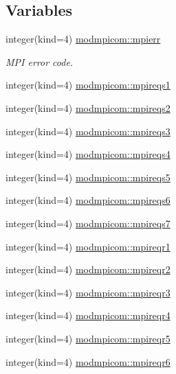 \subsection*{Variables}
\begin{DoxyCompactItemize}
\item 
integer(kind=4) \hyperlink{namespacemodmpicom_a500c48035640d6e5b49b1b694372bcd3}{modmpicom\+::mpierr}
\begin{DoxyCompactList}\small\item\em M\+PI error code. \end{DoxyCompactList}\item 
integer(kind=4) \hyperlink{namespacemodmpicom_a34052e13410e6236c45dcfc1b5563200}{modmpicom\+::mpireqs1}
\item 
integer(kind=4) \hyperlink{namespacemodmpicom_a24670bd8507b230a6be2c2f3afabf5c1}{modmpicom\+::mpireqs2}
\item 
integer(kind=4) \hyperlink{namespacemodmpicom_a7105e5547fa246381624c998c59249b9}{modmpicom\+::mpireqs3}
\item 
integer(kind=4) \hyperlink{namespacemodmpicom_a848fe3dd718230ed7fb98e58796619ea}{modmpicom\+::mpireqs4}
\item 
integer(kind=4) \hyperlink{namespacemodmpicom_a74eac9af638b6438f5a6e0ba77997f33}{modmpicom\+::mpireqs5}
\item 
integer(kind=4) \hyperlink{namespacemodmpicom_adad671e20507f6639f50d87ec487534b}{modmpicom\+::mpireqs6}
\item 
integer(kind=4) \hyperlink{namespacemodmpicom_a42cc3c99615d14140b7b8088760ca8bd}{modmpicom\+::mpireqs7}
\item 
integer(kind=4) \hyperlink{namespacemodmpicom_ac22bfba3e611102e10fdfd1de038f25f}{modmpicom\+::mpireqr1}
\item 
integer(kind=4) \hyperlink{namespacemodmpicom_a825f1ba2f76e8ca1c71b11f4e7b29815}{modmpicom\+::mpireqr2}
\item 
integer(kind=4) \hyperlink{namespacemodmpicom_a3d9bf986389786c043540894df1ad003}{modmpicom\+::mpireqr3}
\item 
integer(kind=4) \hyperlink{namespacemodmpicom_a7a50a2ea228f57406a2f246a57016fa9}{modmpicom\+::mpireqr4}
\item 
integer(kind=4) \hyperlink{namespacemodmpicom_afd68da48bf63f3f360384fa66e7453bd}{modmpicom\+::mpireqr5}
\item 
integer(kind=4) \hyperlink{namespacemodmpicom_a9b3e05d2267d77a7a4af942c9db7f204}{modmpicom\+::mpireqr6}
\item 

\end{DoxyCompactItemize}
